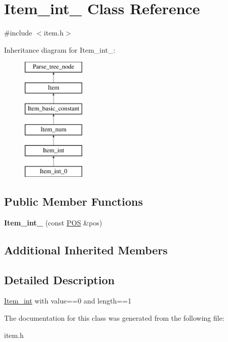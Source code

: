 \hypertarget{classItem__int__0}{}\section{Item\+\_\+int\+\_ Class Reference}
\label{classItem__int__0}


{\ttfamily \#include $<$item.\+h$>$}

Inheritance diagram for Item\+\_\+int\+\_\+:\begin{figure}[H]
\begin{center}
\leavevmode
\includegraphics[height=6.000000cm]{classItem__int__0}
\end{center}
\end{figure}
\subsection*{Public Member Functions}
\begin{DoxyCompactItemize}
\item 
\mbox{\label{classItem__int__0_ad1fd47766eae2cc8dadbac825d135bc4}} 
{\bfseries Item\+\_\+int\+\_} (const \mbox{\hyperlink{structYYLTYPE}{P\+OS}} \&pos)
\end{DoxyCompactItemize}
\subsection*{Additional Inherited Members}


\subsection{Detailed Description}
\mbox{\hyperlink{classItem__int}{Item\+\_\+int}} with value==0 and length==1 

The documentation for this class was generated from the following file\+:\begin{DoxyCompactItemize}
\item 
item.\+h\end{DoxyCompactItemize}
